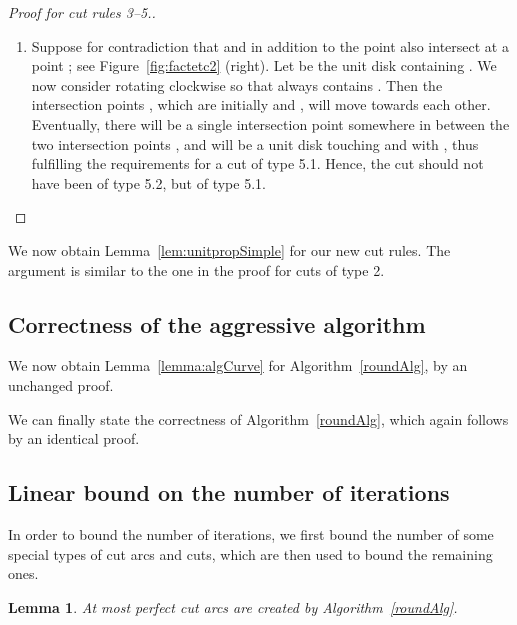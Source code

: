 \documentclass{article}
\newtheorem{lemma}[theorem]{Lemma}
\begin{document}
\begin{proof}[Proof for cut rules 3--5.]
\begin{enumerate}
\begin{enumerate}
\item[5.2]
Suppose for contradiction that  and  in addition to the point  also intersect at a point ; see Figure~\ref{fig:factetc2} (right).
Let  be the unit disk containing .
We now consider rotating  clockwise so that  always contains .
Then the intersection points , which are initially  and , will move towards each other.
Eventually, there will be a single intersection point somewhere in between the two intersection points , and  will be a unit disk touching  and with , thus fulfilling the requirements for a cut of type 5.1.
Hence, the cut should not have been of type 5.2, but of type 5.1.
\qedhere
\end{enumerate}
\end{enumerate}
\end{proof}

We now obtain Lemma~\ref{lem:unitpropSimple} for our new cut rules.
The argument is similar to the one in the proof for cuts of type 2.

\unitdisklemma*

\subsection{Correctness of the aggressive algorithm}

We now obtain Lemma~\ref{lemma:algCurve} for Algorithm~\ref{roundAlg}, by an unchanged proof.

\lemmaalgcurve*

We can finally state the correctness of Algorithm~\ref{roundAlg}, which again follows by an identical proof.

\thmcorrect*



\subsection{Linear bound on the number of iterations}
\label{sec:linear}

In order to bound the number of iterations,  we first bound the number of some special types of cut arcs and cuts, which are then used to bound the remaining ones.

\begin{lemma}\label{lem:perfCutArcs}
At most  perfect cut arcs are created by Algorithm~\ref{roundAlg}.
\end{lemma}
\end{document}
